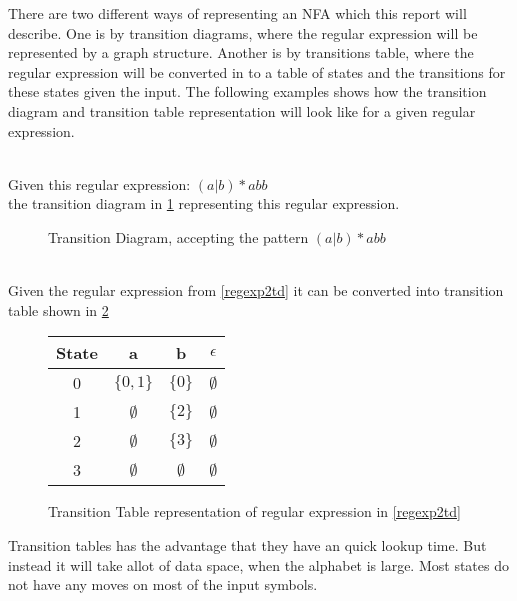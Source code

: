 There are two different ways of representing an NFA which this report will
describe. One is by transition diagrams, where the regular expression will be
represented by a graph structure. Another is by transitions table, where the 
regular expression will be converted in to a table of states and the 
transitions for these states given the input. The following examples shows how 
the transition diagram and transition table representation will look like for a 
given regular expression.

\begin{example} \label{regexp2td}
\cite{Aho2006}\\
Given this regular expression: $(a | b)* abb$ \\
the transition diagram in \cref{fig:td} representing this regular expression.
\end{example}
\begin{figure}[h!]
  \centering
  \caption{Transition Diagram, accepting the pattern  $(a | b)* abb$ 
  \label{fig:td}}
  \end{figure}

\begin{example} \label{regexp2tt}
\cite{Aho2006}\\
Given the regular expression from \cref{regexp2td} it can be converted into transition table shown in \cref{fig:tt}
\end{example}
\begin{figure}[h!]
  \centering
  \begin{tabular}{| c | c c c |}
    \hline
    \hline
    State & a & b & $\epsilon$\\
    \hline
    0 & $\{0, 1\}$ & $\{0\}$ & $\emptyset$ \\
    1 & $\emptyset$ & $\{2\}$ & $\emptyset$ \\
    2 & $\emptyset$ & $\{3\}$ & $\emptyset$ \\
    3 & $\emptyset$ & $\emptyset$ & $\emptyset$ \\
    \hline
  \end{tabular}
  \caption{Transition Table representation of regular expression in 
        \cref{regexp2td} \label{fig:tt}}
\end{figure}
Transition tables has the advantage that they have an quick lookup time. But 
instead it will take allot of data space, when the alphabet is large. Most 
states do not have any moves on most of the input symbols. \cite{Aho2006}
